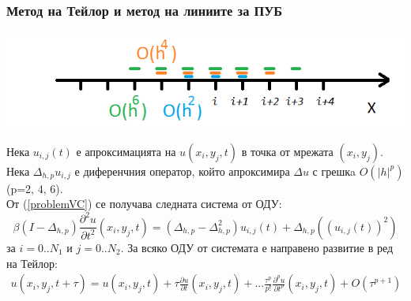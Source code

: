 \documentclass{beamer}
\newcommand{\be}{\begin{equation}}
\newcommand{\ee}{\end{equation}}
\newcommand{\rf}[1]{(\ref{#1})}
\begin{document}

\begin{frame}
\frametitle{Метод на Тейлор и метод на линиите за ПУБ}
\begin{center}\vspace{0.25cm}
	\begin{minipage}[b]{0.45\linewidth}
		 \includegraphics[width=\linewidth]{../amitans/figures/FDS.png}
	\end{minipage}	
\end{center}
Нека $u_{i,j}(t)$ е апроксимацията на $u(x_i, y_j, t)$ в точка от мрежата $(x_i, y_j)$.
\\
Нека $\Delta_{h,p} u_{i,j}$ е диференчния оператор, който апроксимира $\Delta u$ с грешкa $O(|h|^p)$ (p=2, 4, 6).
\\
От \rf{problemVC} се получава следната система от ОДУ:
\be \label{DiscreteEq}
\beta (I-\Delta_{h,p}) \frac{\partial^2 u}{\partial t^2}(x_i, y_j, t)=
 (\Delta_{h,p} - \Delta_{h,p}^2) u_{i, j}(t) + \Delta_{h,p} ( ( u_{i, j}(t) )^2 )
\ee
за $i = 0..N_1$ и $j=0..N_2$. За всяко ОДУ от системата е направено развитие в ред на Тейлор:
\begin{align} \label{TSe}
u(x_i, y_j, t+\tau) = u(x_i, y_j, t) + \tau \frac{ \partial u }{ \partial t }(x_i, y_j, t)  + ... 
\frac{ \tau^p }{ p! } \frac{ \partial^p u }{ \partial t^p }(x_i, y_j, t) + O(\tau^{p+1})
\end{align}

\end{frame}

\end{document}
